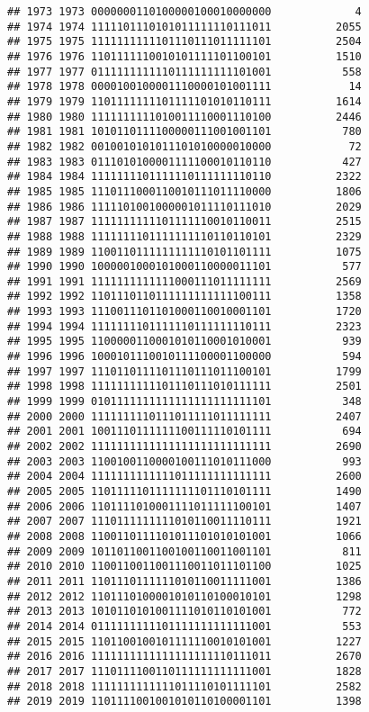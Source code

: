 \documentclass[]{article}
\begin{document}
\begin{verbatim}
## 1973 1973 0000000110100000100010000000             4
## 1974 1974 1111101110101011111110111011          2055
## 1975 1975 1111111111101110111011111101          2504
## 1976 1976 1101111110010101111101100101          1510
## 1977 1977 0111111111110111111111101001           558
## 1978 1978 0000100100001110000101001111            14
## 1979 1979 1101111111101111101010110111          1614
## 1980 1980 1111111111010011110001110100          2446
## 1981 1981 1010110111100000111001001101           780
## 1982 1982 0010010101011101010000010000            72
## 1983 1983 0111010100001111100010110110           427
## 1984 1984 1111111101111110111111110110          2322
## 1985 1985 1110111000110010111011110000          1806
## 1986 1986 1111101001000001011110111010          2029
## 1987 1987 1111111111101111110010110011          2515
## 1988 1988 1111111101111111110110110101          2329
## 1989 1989 1100110111111111110101101111          1075
## 1990 1990 1000001000101000110000011101           577
## 1991 1991 1111111111111000111011111111          2569
## 1992 1992 1101110110111111111111100111          1358
## 1993 1993 1110011101101000110010001101          1720
## 1994 1994 1111111101111110111111110111          2323
## 1995 1995 1100000110001010110001010001           939
## 1996 1996 1000101110010111100001100000           594
## 1997 1997 1110110111101110111011100101          1799
## 1998 1998 1111111111101110111010111111          2501
## 1999 1999 0101111111111111111111111101           348
## 2000 2000 1111111110111011111011111111          2407
## 2001 2001 1001110111111100111110101111           694
## 2002 2002 1111111111111111111111111111          2690
## 2003 2003 1100100110000100111010111000           993
## 2004 2004 1111111111111011111111111111          2600
## 2005 2005 1101111101111111101110101111          1490
## 2006 2006 1101111010001111011111100101          1407
## 2007 2007 1110111111111010110011110111          1921
## 2008 2008 1100110111101011101010101001          1066
## 2009 2009 1011011001100100110011001101           811
## 2010 2010 1100110011001110011011101100          1025
## 2011 2011 1101110111111010110011111001          1386
## 2012 2012 1101110100001010110100010101          1298
## 2013 2013 1010110101001111010110101001           772
## 2014 2014 0111111111101111111111111001           553
## 2015 2015 1101100100101111110010101001          1227
## 2016 2016 1111111111111111111110111011          2670
## 2017 2017 1110111100110111111111111001          1828
## 2018 2018 1111111111111011110101111101          2582
## 2019 2019 1101111001001010110100001101          1398

\end{verbatim}
\end{document}
